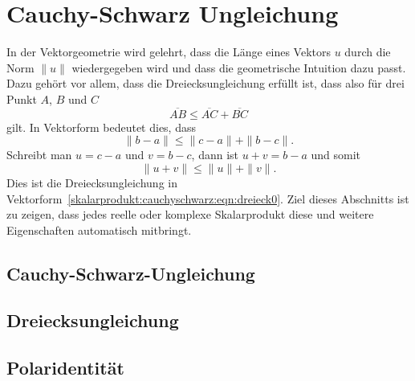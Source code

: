 %
%
%
\section{Cauchy-Schwarz Ungleichung
\label{buch:skalarprodukte:section:cauchyschwarz}}
In der Vektorgeometrie wird gelehrt, dass die Länge eines Vektors $u$
durch die Norm $\|u\|$ wiedergegeben wird und dass die geometrische
Intuition dazu passt.
Dazu gehört vor allem, dass die Dreiecksungleichung erfüllt ist,
dass also für drei Punkt $A$, $B$ und $C$
\[
\overline{AB} \le \overline{AC} + \overline{BC}
\]
gilt.
In Vektorform bedeutet dies, dass
\[
\| b-a\|
\le
\| c-a\| + \|b-c\|.
\]
Schreibt man $u=c-a$ und $v=b-c$, dann ist $u+v=b-a$ und somit
\begin{equation}
\| u+v\| \le \|u\| + \|v\|.
\label{skalarprodukt:cauchyschwarz:eqn:dreieck0}
\end{equation}
Dies ist die Dreiecksungleichung in
Vektorform~\eqref{skalarprodukt:cauchyschwarz:eqn:dreieck0}.
Ziel dieses Abschnitts ist zu zeigen, dass jedes reelle oder
komplexe Skalarprodukt diese und weitere Eigenschaften automatisch
mitbringt.

%
%
\subsection{Cauchy-Schwarz-Ungleichung}

%
%
\subsection{Dreiecksungleichung}

%
%
\subsection{Polaridentität}
